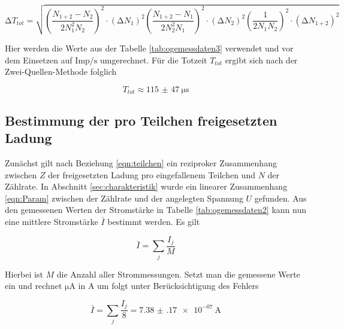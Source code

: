 \begin{equation*}
\increment T_{tot} = \sqrt{\left( \frac{N_{1+2} - N_{2}}{2 N_{1}^{2} N_{2}}\right)^2 \cdot (\increment N_{1})^{2} 
\left( \frac{N_{1+2} - N_{1}}{2 N_{2}^{2} N_{1}}\right)^2 \cdot (\increment N_{2})^{2} 
\left( \frac{1}{2 N_{1} N_{2}}\right)^2 \cdot (\increment N_{1+2})^{2}} 
\end{equation*}

Hier werden die Werte aus der Tabelle \ref{tab:ogemessdaten3} verwendet und vor dem Einsetzen auf $\text{Imp} / \si{\second}$ umgerechnet.
Für die Totzeit $T_{tot}$ ergibt sich nach der Zwei-Quellen-Methode folglich

\begin{equation}
T_{tot} \approx \SI{115(47)}{\micro\second}
\end{equation}

\subsection{Bestimmung der pro Teilchen freigesetzten Ladung}

Zunächst gilt nach Beziehung \eqref{eqn:teilchen} ein reziproker Zusammenhang zwischen $Z$ der freigesetzten Ladung pro eingefallenem Teilchen und $N$ der
Zählrate. In Abschnitt \ref{sec:charakteristik} wurde ein linearer Zusammenhang \eqref{eqn:Param} zwischen der Zählrate und der angelegten Spannung $U$ gefunden.
Aus den gemessenen Werten der Stromstärke in Tabelle \ref{tab:ogemessdaten2} kann nun eine mittlere Stromstärke $\bar{I}$ bestimmt werden.
Es gilt

\begin{equation}
\bar{I} = \sum_{j}^{} \frac{I_{j}}{M}
\end{equation}

Hierbei ist $M$ die Anzahl aller Strommessungen. Setzt man die gemessene Werte ein und rechnet $\si{\micro\ampere}$ in $\si{\ampere}$ um folgt
unter Berücksichtigung des Fehlers

\begin{equation}
\bar{I} = \sum_{j}^{} \frac{I_{j}}{8} = \SI{7.38(17)e-07}{\ampere}
\end{equation}